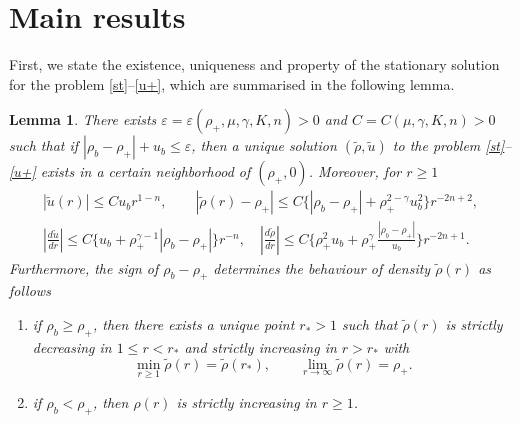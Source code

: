 \documentclass[a4paper,12pt,draft]{article}
\newtheorem{lemma}[theorem]{Lemma}
\theoremstyle{remark}
\def\ut{\tilde{u}}
\def\rt{\tilde{\rho}}
\def\ep{\varepsilon}
\begin{document}
\section{Main results}\label{sec:MR}
First, we state the existence, uniqueness and property of the stationary solution for the problem \eqref{st}--\eqref{u+}, which are summarised in the following lemma.
\begin{lemma} \label{le:st}
There exists $\ep=\ep(\rho_+,\mu,\gamma,K,n)>0$ and $C=C(\mu,\gamma,K,n)>0$ such that if $|\rho_b-\rho_+|+ u_b\le \ep$, then a unique solution $(\tilde{\rho}, \tilde{u})$ to the problem \eqref{st}--\eqref{u+} exists in a certain neighborhood of $(\rho_+, 0)$. Moreover, for $r\ge 1$
\begin{gather} 
\label{rho}|\ut(r)|\le C u_b r^{1-n}, \qquad |\rt(r)-\rho_+|\leq C\big\{ |\rho_b-\rho_{+}| + \rho_{+}^{2-\gamma} u_b^2 \big\}   r^{-2n+2},\\
\label{ur} \left|\frac{d \ut}{dr}\right| %
\leq C \Big\{ u_b + \rho_{+}^{\gamma-1}|\rho_b-\rho_+| \Big\}r^{-n}, \quad  
\left|\frac{d\rt}{dr}\right|%
\leq C\Big\{ \rho_{+}^2 u_b + \rho_{+}^{\gamma} \frac{|\rho_{b}-\rho_{+}|}{u_b} \Big\}   r^{-2n+1}. 
\end{gather}
Furthermore, the sign of $\rho_b-\rho_+$ determines the behaviour of density $\rt(r)$ as follows
\begin{enumerate}[label=\textnormal{(\Roman*)},ref=\textnormal{(\Roman*)}]
    \item\label{item:I} if $\rho_b \ge \rho_+$, then there exists a unique point $r_{\ast}>1$ such that $\rt(r)$ is strictly decreasing in $1\le r< r_{\ast}$ and strictly increasing in $r> r_{\ast}$ with
    \begin{equation*}
        \min\limits_{r\ge 1} \rt(r) = \rt(r_{\ast}), \qquad  \lim\limits_{r\to\infty} \rt(r) = \rho_+.
    \end{equation*}
    \item\label{item:II} if $\rho_b < \rho_{+}$, then $\rho(r)$ is strictly increasing in $r\ge 1$.
\end{enumerate}
\end{lemma}
\end{document}
